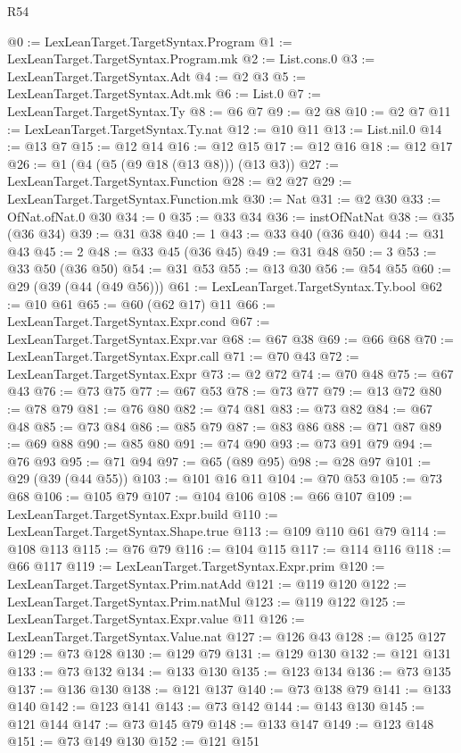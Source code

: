 \begin{lexlean}{R54}
\begin{coremodule}
@0 := LexLeanTarget.TargetSyntax.Program
@1 := LexLeanTarget.TargetSyntax.Program.mk
@2 := List.cons.{0}
@3 := LexLeanTarget.TargetSyntax.Adt
@4 := @2 @3
@5 := LexLeanTarget.TargetSyntax.Adt.mk
@6 := List.{0}
@7 := LexLeanTarget.TargetSyntax.Ty
@8 := @6 @7
@9 := @2 @8
@10 := @2 @7
@11 := LexLeanTarget.TargetSyntax.Ty.nat
@12 := @10 @11
@13 := List.nil.{0}
@14 := @13 @7
@15 := @12 @14
@16 := @12 @15
@17 := @12 @16
@18 := @12 @17
@26 := @1 (@4 (@5 (@9 @18 (@13 @8))) (@13 @3))
@27 := LexLeanTarget.TargetSyntax.Function
@28 := @2 @27
@29 := LexLeanTarget.TargetSyntax.Function.mk
@30 := Nat
@31 := @2 @30
@33 := OfNat.ofNat.{0} @30
@34 := 0
@35 := @33 @34
@36 := instOfNatNat
@38 := @35 (@36 @34)
@39 := @31 @38
@40 := 1
@43 := @33 @40 (@36 @40)
@44 := @31 @43
@45 := 2
@48 := @33 @45 (@36 @45)
@49 := @31 @48
@50 := 3
@53 := @33 @50 (@36 @50)
@54 := @31 @53
@55 := @13 @30
@56 := @54 @55
@60 := @29 (@39 (@44 (@49 @56)))
@61 := LexLeanTarget.TargetSyntax.Ty.bool
@62 := @10 @61
@65 := @60 (@62 @17) @11
@66 := LexLeanTarget.TargetSyntax.Expr.cond
@67 := LexLeanTarget.TargetSyntax.Expr.var
@68 := @67 @38
@69 := @66 @68
@70 := LexLeanTarget.TargetSyntax.Expr.call
@71 := @70 @43
@72 := LexLeanTarget.TargetSyntax.Expr
@73 := @2 @72
@74 := @70 @48
@75 := @67 @43
@76 := @73 @75
@77 := @67 @53
@78 := @73 @77
@79 := @13 @72
@80 := @78 @79
@81 := @76 @80
@82 := @74 @81
@83 := @73 @82
@84 := @67 @48
@85 := @73 @84
@86 := @85 @79
@87 := @83 @86
@88 := @71 @87
@89 := @69 @88
@90 := @85 @80
@91 := @74 @90
@93 := @73 @91 @79
@94 := @76 @93
@95 := @71 @94
@97 := @65 (@89 @95)
@98 := @28 @97
@101 := @29 (@39 (@44 @55))
@103 := @101 @16 @11
@104 := @70 @53
@105 := @73 @68
@106 := @105 @79
@107 := @104 @106
@108 := @66 @107
@109 := LexLeanTarget.TargetSyntax.Expr.build
@110 := LexLeanTarget.TargetSyntax.Shape.true
@113 := @109 @110 @61 @79
@114 := @108 @113
@115 := @76 @79
@116 := @104 @115
@117 := @114 @116
@118 := @66 @117
@119 := LexLeanTarget.TargetSyntax.Expr.prim
@120 := LexLeanTarget.TargetSyntax.Prim.natAdd
@121 := @119 @120
@122 := LexLeanTarget.TargetSyntax.Prim.natMul
@123 := @119 @122
@125 := LexLeanTarget.TargetSyntax.Expr.value @11
@126 := LexLeanTarget.TargetSyntax.Value.nat
@127 := @126 @43
@128 := @125 @127
@129 := @73 @128
@130 := @129 @79
@131 := @129 @130
@132 := @121 @131
@133 := @73 @132
@134 := @133 @130
@135 := @123 @134
@136 := @73 @135
@137 := @136 @130
@138 := @121 @137
@140 := @73 @138 @79
@141 := @133 @140
@142 := @123 @141
@143 := @73 @142
@144 := @143 @130
@145 := @121 @144
@147 := @73 @145 @79
@148 := @133 @147
@149 := @123 @148
@151 := @73 @149 @130
@152 := @121 @151

\end{coremodule}
\end{lexlean}
